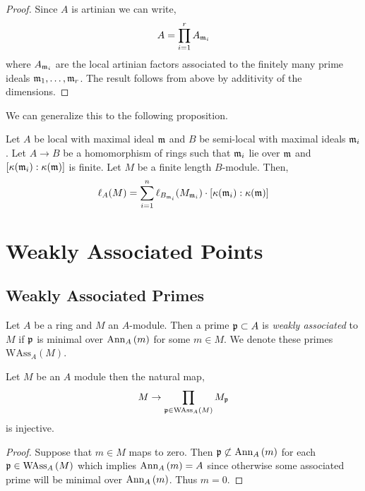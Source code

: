 \documentclass[12pt]{article}
\begin{document}
\begin{proof}
Since $A$ is artinian we can write,
\[ A = \prod_{i = 1}^r A_{\mathfrak{m}_i} \]
where $A_{\mathfrak{m}_i}$ are the local artinian factors associated to the finitely many prime ideals $\mathfrak{m}_1, \dots, \mathfrak{m}_r$. The result follows from above by additivity of the dimensions.
\end{proof}

\begin{rmk}
We can generalize this to the following proposition.
\end{rmk}

\begin{prop}
Let $A$ be local with maximal ideal $\mathfrak{m}$ and $B$ be semi-local with maximal ideals $\mathfrak{m}_i$. Let $A \to B$ be a homomorphism of rings such that $\mathfrak{m}_i$ lie over $\mathfrak{m}$ and $[\kappa(\mathfrak{m}_i) : \kappa(\mathfrak{m})]$ is finite. Let $M$ be a finite length $B$-module. Then,
\[ \ell_A(M) = \sum_{i = 1}^n \ell_{B_{\mathfrak{m}_i}}(M_{\mathfrak{m}_i}) \cdot [\kappa(\mathfrak{m}_i) : \kappa(\mathfrak{m})] \]
\end{prop}

\section{Weakly Associated Points}

\newcommand{\WAss}[2]{\mathrm{WAss}_{#1}\left(#2 \right)}

\subsection{Weakly Associated Primes}

\begin{defn}
Let $A$ be a ring and $M$ an $A$-module. Then a prime $\mathfrak{p} \subset A$ is \textit{weakly associated} to $M$ if $\mathfrak{p}$ is minimal over $\mathrm{Ann}_{A}\left(m\right)$ for some $m \in M$. We denote these primes $\WAss{A}{M}$.
\end{defn}

\begin{lemma}
Let $M$ be an $A$ module then the natural map,
\[ M \to \prod_{\p \in \WAss{A}{M}} M_\p \]
is injective.
\end{lemma}

\begin{proof}
Suppose that $m \in M$ maps to zero. Then $\mathfrak{p} \not\subset \mathrm{Ann}_{A}\left(m\right)$ for each $\p \in \WAss{A}{M}$ which implies $\mathrm{Ann}_{A}\left(m\right) = A$ since otherwise some associated prime will be minimal over $\mathrm{Ann}_{A}\left(m\right)$. Thus $m = 0$.
\end{proof}
\end{document}
